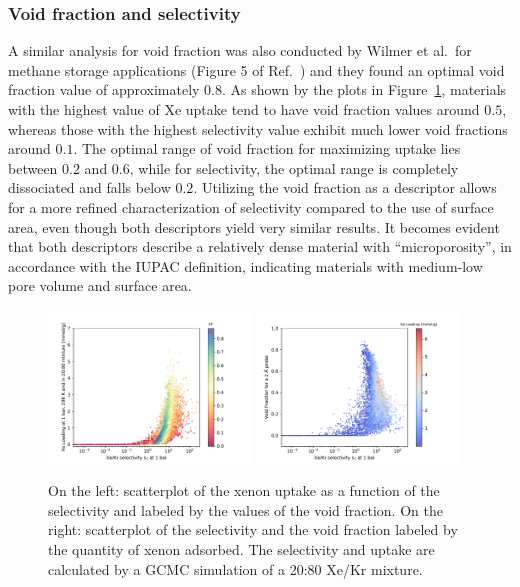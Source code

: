 \documentclass[main.tex]{subfiles}
\begin{document}
\subsubsection{Void fraction and selectivity}

A similar analysis for void fraction was also conducted by Wilmer et al.\ for methane storage applications (Figure 5 of Ref.~\cite{Wilmer_2012}) and they found an optimal void fraction value of approximately $0.8$. As shown by the plots in Figure~\ref{fgr:vol}, materials with the highest value of Xe uptake tend to have void fraction values around $0.5$, whereas those with the highest selectivity value exhibit much lower void fractions around $0.1$. The optimal range of void fraction for maximizing uptake lies between $0.2$ and $0.6$, while for selectivity, the optimal range is completely dissociated and falls below $0.2$. Utilizing the void fraction as a descriptor allows for a more refined characterization of selectivity compared to the use of surface area, even though both descriptors yield very similar results. It becomes evident that both descriptors describe a relatively dense material with ``microporosity'', in accordance with the IUPAC definition\autocite{Sing_1985}, indicating materials with medium-low pore volume and surface area.

\begin{figure}[ht]
  \centering
  \includegraphics[width=0.48\textwidth]{figures/2-thermo/Scatterplot_uptake_selectivity_vol.pdf}
  \hfill
  \includegraphics[width=0.48\textwidth]{figures/2-thermo/Scatterplot_vol_selectivity.pdf}
  \caption{On the left: scatterplot of the xenon uptake as a function of the selectivity and labeled by the values of the void fraction. On the right: scatterplot of the selectivity and the void fraction labeled by the quantity of xenon adsorbed. The selectivity and uptake are calculated by a GCMC simulation of a 20:80 Xe/Kr mixture.}\label{fgr:vol}
\end{figure}
\end{document}
